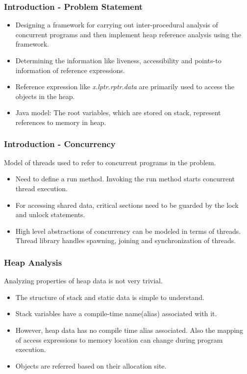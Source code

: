 \documentclass{beamer}
\begin{document}
	
  \begin{frame}
  \frametitle{Introduction - Problem Statement}
  \begin{itemize}
  \item Designing a framework for carrying
  out inter-procedural analysis of concurrent programs and then implement heap reference analysis using the framework.
  \item Determining the information like liveness,
  accessibility and points-to information of reference expressions.
  \item Reference expression like \emph{x.lptr.rptr.data} are primarily used to access the objects in the heap.
  \item Java model: The root variables, which are stored on stack, represent references to memory in heap.
     
  \end{itemize}
  \end{frame}
  
  \begin{frame}
  	\frametitle{Introduction - Concurrency}
  	
  	 Model of threads used to refer to concurrent programs in the problem.
  	\begin{itemize}
  		\item Need to define a run method. Invoking the run method starts concurrent thread execution.
  		\item For accessing shared data,
  		critical sections need to be guarded by the lock and unlock statements.
  		\item High level abstractions of concurrency can be modeled in terms of threads. Thread library handles spawning, joining and synchronization of threads. 
  		
  	\end{itemize}
  	
  \end{frame}
  
  \begin{frame}
\frametitle{Heap Analysis}
	Analyzing properties of heap data is not very trivial.  

\begin{itemize}
	\item The structure of stack and static data is simple to understand. 
	\item Stack variables have a compile-time name(alias) associated with it.
	\item However, heap data has no compile time alias associated. Also the mapping of access expressions to memory location can change during program execution.
	\item Objects are referred based on their allocation site.
\end{itemize}
  \end{frame}
  
\end{document}
